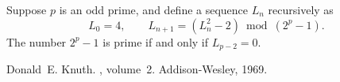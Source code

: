 \documentclass[12pt]{article}
\begin{document}
Suppose $p$ is an odd prime, and define a sequence $L_n$ recursively as
\begin{equation*}
L_0=4,\qquad L_{n+1}=(L_n^2-2) \bmod (2^p-1).
\end{equation*}
The number $2^p-1$ is prime if and only if $L_{p-2}=0$.

\begin{thebibliography}{1}

Donald~E. Knuth.
, volume~2.
\newblock Addison-Wesley, 1969.

\end{thebibliography}

\end{document}

